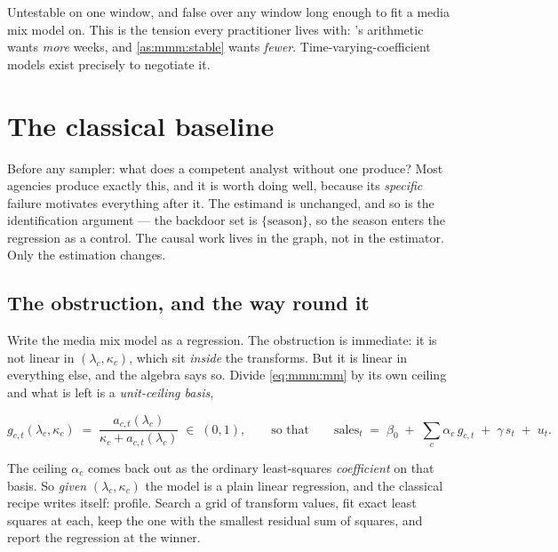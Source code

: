 Untestable on one window, and false over any window long enough to fit a media mix model on. This
is the tension every practitioner lives with: \citet{lewis2015}'s arithmetic wants \emph{more}
weeks, and \cref{as:mmm:stable} wants \emph{fewer}. Time-varying-coefficient models
\citep{ng2021} exist precisely to negotiate it.

\section{The classical baseline}
\label{sec:mmm:classical}

Before any sampler: what does a competent analyst without one produce? Most agencies produce
exactly this, and it is worth doing well, because its \emph{specific} failure motivates everything
after it. The estimand is unchanged, and so is the identification argument --- the backdoor set is
$\{\text{season}\}$, so the season enters the regression as a control. The causal work lives in
the graph, not in the estimator. Only the estimation changes.

\subsection*{The obstruction, and the way round it}

Write the media mix model as a regression. The obstruction is immediate: it is not linear in
$(\lambda_c, \kappa_c)$, which sit \emph{inside} the transforms. But it is linear in everything
else, and the algebra says so. Divide \cref{eq:mmm:mm} by its own ceiling and what is left is a
\emph{unit-ceiling basis},

\begin{equation}
  g_{c,t}(\lambda_c, \kappa_c)
    \;=\; \frac{a_{c,t}(\lambda_c)}{\kappa_c + a_{c,t}(\lambda_c)} \;\in\; (0, 1),
  \qquad\text{so that}\qquad
  \text{sales}_t \;=\; \beta_0 \;+\; \sum_c \alpha_c\, g_{c,t} \;+\; \gamma\, s_t \;+\; u_t .
  \label{eq:mmm:ols}
\end{equation}

The ceiling $\alpha_c$ comes back out as the ordinary least-squares \emph{coefficient} on that
basis. So \emph{given} $(\lambda_c, \kappa_c)$ the model is a plain linear regression, and the
classical recipe writes itself: profile. Search a grid of transform values, fit exact least
squares at each, keep the one with the smallest residual sum of squares, and report the regression
at the winner.

